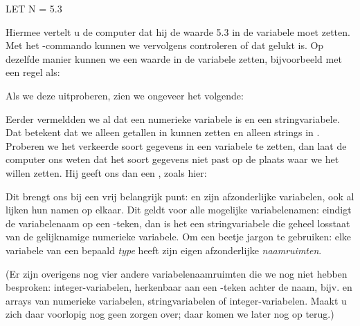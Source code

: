 \begin{screencode}
  LET N = 5.3
\end{screencode}

\needspace{4cm} %
Hiermee vertelt u de computer dat hij de waarde 5.3 in de variabele  moet zetten. Met het -commando kunnen we vervolgens controleren of dat gelukt is. Op dezelfde manier kunnen we een waarde in de variabele  zetten, bijvoorbeeld met een regel als:


\needspace{4cm} %
Als we deze uitproberen, zien we ongeveer het volgende:


\needspace{4cm} %
Eerder vermeldden we al dat  een numerieke variabele is en  een stringvariabele. Dat betekent dat we alleen getallen in  kunnen zetten en alleen strings in . Proberen we het verkeerde soort gegevens in een variabele te zetten, dan laat de computer ons weten dat het soort gegevens niet past op de plaats waar we het willen zetten. Hij geeft ons dan een , zoals hier:


Dit brengt ons bij een vrij belangrijk punt:  en  zijn afzonderlijke variabelen, ook al lijken hun namen op elkaar. Dit geldt voor alle mogelijke variabelenamen: eindigt de variabelenaam op een \screentextwide{\$}-teken, dan is het een stringvariabele die geheel losstaat van de gelijknamige numerieke variabele. Om een beetje jargon te gebruiken: elke variabele van een bepaald {\em type} heeft zijn eigen afzonderlijke {\em naamruimten}.

(Er zijn overigens nog vier andere variabelenaamruimten die we nog niet hebben besproken: integer-variabelen, herkenbaar aan een \screentextwide{\%}-teken achter de naam, bijv.  en arrays van numerieke variabelen, stringvariabelen of integer-variabelen. Maakt u zich daar voorlopig nog geen zorgen over; daar komen we later nog op terug.)

